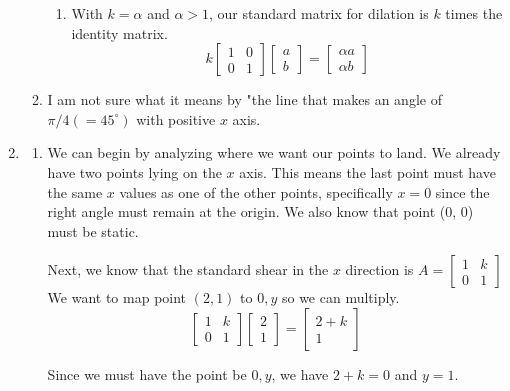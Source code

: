 \documentclass[11pt, letterpaper, twoside]{article}
\begin{document}
\begin{enumerate}
\begin{enumerate}[label=\alph*)]
\begin{enumerate}[label=\roman*)]
\item With \(k=\alpha\) and \(\alpha>1\), our standard matrix for dilation is \(k\) times the identity matrix.
\[k \begin{bmatrix}
    1&0\\
    0&1
\end{bmatrix}\begin{bmatrix}
    a\\
    b
\end{bmatrix}=\begin{bmatrix}
    \alpha a\\
    \alpha b
\end{bmatrix}\]
\end{enumerate}
\item I am not sure what it means by "the line that makes an angle of \(\pi/4(=45^\circ)\) with positive \(x\) axis.
\end{enumerate}
\item \begin{enumerate}[label=\alph*)]
\item We can begin by analyzing where we want our points to land.
We already have two points lying on the \(x\) axis. 
This means the last point must have the same \(x\) values as one of the other points, specifically \(x=0\) since the right angle must remain at the origin.
We also know that point (0, 0) must be static. 

Next, we know that the standard shear in the \(x\) direction is \(A=\begin{bmatrix}
1&k\\
0&1
\end{bmatrix}\)
We want to map point \((2,1)\) to \(0, y\) so we can multiply.
\[\begin{bmatrix}
1&k\\
0&1
\end{bmatrix}
\begin{bmatrix}
2\\
1
\end{bmatrix}=\begin{bmatrix}
    2+k\\
    1
\end{bmatrix}\]

Since we must have the point be \(0,y\), we have \(2+k=0\) and \(y=1\).


\end{enumerate}
\end{enumerate}
\end{document}
